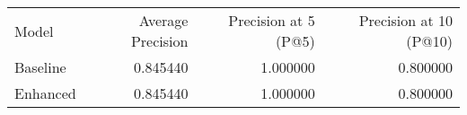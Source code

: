 \begin{tabular}{lrrr}
Model & Average Precision & Precision at 5 (P@5) & Precision at 10 (P@10) \\
Baseline & 0.845440 & 1.000000 & 0.800000 \\
Enhanced & 0.845440 & 1.000000 & 0.800000 \\
\end{tabular}
